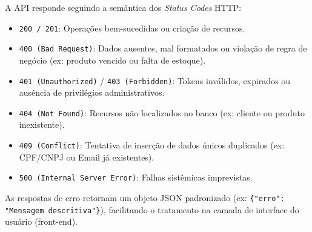 A API responde seguindo a semântica dos \textit{Status Codes} HTTP:

\begin{itemize}
    \item \texttt{200 / 201}: Operações bem-sucedidas ou criação de recursos.

    \item \texttt{400 (Bad Request)}: Dados ausentes, mal formatados ou violação de regra de negócio (ex: produto vencido ou falta de estoque).

    \item \texttt{401 (Unauthorized)} / \texttt{403 (Forbidden)}: Tokens inválidos, expirados ou ausência de privilégios administrativos.

    \item \texttt{404 (Not Found)}: Recursos não localizados no banco (ex: cliente ou produto inexistente).

    \item \texttt{409 (Conflict)}: Tentativa de inserção de dados únicos duplicados (ex: CPF/CNPJ ou Email já existentes).

    \item \texttt{500 (Internal Server Error)}: Falhas sistêmicas imprevistas.
\end{itemize}

As respostas de erro retornam um objeto JSON padronizado (ex: \texttt{\{"erro": "Mensagem descritiva"\}}), facilitando o tratamento na camada de interface do usuário (front-end).